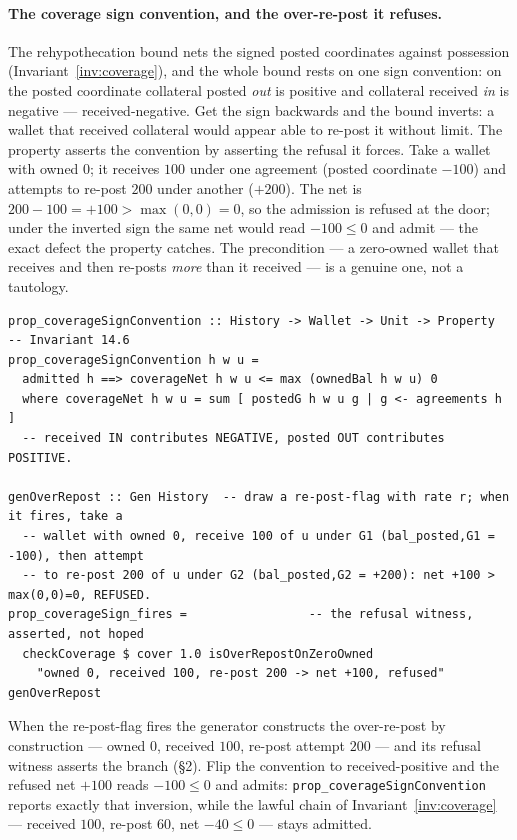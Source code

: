 \documentclass[11pt,a4paper]{article}
\begin{document}
\paragraph{The coverage sign convention, and the over-re-post it refuses.}
The rehypothecation bound nets the signed posted coordinates against possession
(Invariant~\ref{inv:coverage}), and the whole bound rests on one sign convention: on
the posted coordinate collateral posted \emph{out} is positive and collateral
received \emph{in} is negative --- received-negative. Get the sign backwards and the
bound inverts: a wallet that received collateral would appear able to re-post it
without limit. The property asserts the convention by asserting the refusal it
forces. Take a wallet with owned $0$; it receives $100$ under one agreement (posted
coordinate $-100$) and attempts to re-post $200$ under another ($+200$). The net is
$200-100=+100>\max(0,0)=0$, so the admission is refused at the door; under the
inverted sign the same net would read $-100\le 0$ and admit --- the exact defect the
property catches. The precondition --- a zero-owned wallet that receives and then
re-posts \emph{more} than it received --- is a genuine one, not a tautology.

\begin{lstlisting}
prop_coverageSignConvention :: History -> Wallet -> Unit -> Property  -- Invariant 14.6
prop_coverageSignConvention h w u =
  admitted h ==> coverageNet h w u <= max (ownedBal h w u) 0
  where coverageNet h w u = sum [ postedG h w u g | g <- agreements h ]
  -- received IN contributes NEGATIVE, posted OUT contributes POSITIVE.

genOverRepost :: Gen History  -- draw a re-post-flag with rate r; when it fires, take a
  -- wallet with owned 0, receive 100 of u under G1 (bal_posted,G1 = -100), then attempt
  -- to re-post 200 of u under G2 (bal_posted,G2 = +200): net +100 > max(0,0)=0, REFUSED.
prop_coverageSign_fires =                 -- the refusal witness, asserted, not hoped
  checkCoverage $ cover 1.0 isOverRepostOnZeroOwned
    "owned 0, received 100, re-post 200 -> net +100, refused" genOverRepost
\end{lstlisting}

When the re-post-flag fires the generator constructs the over-re-post by construction
--- owned $0$, received $100$, re-post attempt $200$ --- and its refusal witness asserts
the branch (\S 2). Flip the convention to received-positive and the refused net $+100$ reads
$-100 \le 0$ and admits: \texttt{prop\_coverageSignConvention} reports exactly that
inversion, while the lawful chain of Invariant~\ref{inv:coverage} --- received $100$,
re-post $60$, net $-40 \le 0$ --- stays admitted.
\end{document}
